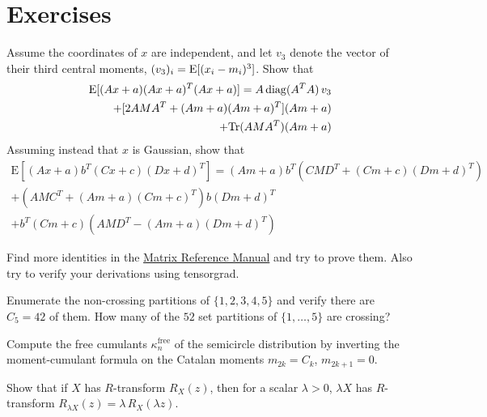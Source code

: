 \section{Exercises}
\begin{exercise}
   Assume the coordinates of $x$ are independent, and let $v_3$ denote the vector of their third central moments, $(v_3)_i = \mathrm{E}[(x_i - m_i)^3]$. Show that
   \begin{align*}
   \mathrm{E}[(Ax + a)(Ax + a)^T (Ax + a)] =
   A\,\mathrm{diag}(A^T A)\, v_3 \\
   + [2 AMA^T + (Am + a)(Am + a)^T] (Am + a) \\
   + \mathrm{Tr}(AMA^T)(Am + a)
   \end{align*}
   Assuming instead that $x$ is Gaussian, show that
   \begin{align*}
   \mathrm{E}[(Ax + a) b^T (Cx + c)(Dx + d)^T] =
   (Am + a) b^T (CMD^T + (Cm + c)(Dm + d)^T) \\
   + (AMC^T + (Am + a)(Cm + c)^T) b(Dm + d)^T \\
   + b^T (Cm + c)(AMD^T - (Am + a)(Dm + d)^T)
   \end{align*}
\end{exercise}
\begin{exercise}
   Find more identities in the \href{http://www.ee.ic.ac.uk/hp/staff/dmb/matrix/expect.html}{Matrix Reference Manual} and try to prove them.
   Also try to verify your derivations using tensorgrad.
\end{exercise}
\begin{exercise}
   Enumerate the non-crossing partitions of $\{1, 2, 3, 4, 5\}$ and verify there are $C_5 = 42$ of them. How many of the $52$ set partitions of $\{1, \dots, 5\}$ are crossing?
\end{exercise}
\begin{exercise}
   Compute the free cumulants $\kappa_n^{\mathrm{free}}$ of the semicircle distribution by inverting the moment-cumulant formula on the Catalan moments $m_{2k} = C_k$, $m_{2k+1} = 0$.
\end{exercise}
\begin{exercise}
   Show that if $X$ has $R$-transform $R_X(z)$, then for a scalar $\lambda > 0$, $\lambda X$ has $R$-transform $R_{\lambda X}(z) = \lambda\, R_X(\lambda z)$.
\end{exercise}
